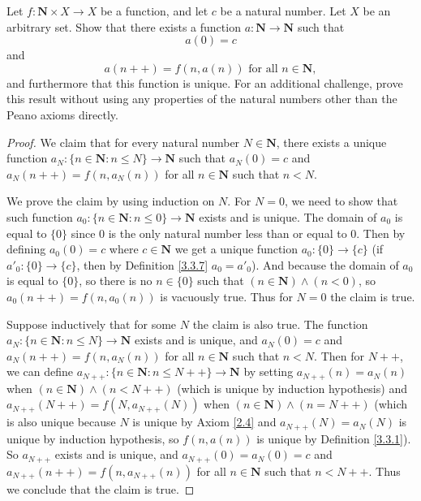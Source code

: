 \begin{exercise}\label{ex 3.5.12}
Let \(f : \mathbf{N} \times X \to X\) be a function, and let \(c\) be a natural number.
Let \(X\) be an arbitrary set.
Show that there exists a function \(a : \mathbf{N} \to \mathbf{N}\) such that
\[
    a(0) = c
\]
and
\[
    a(n++) = f(n, a(n)) \text{ for all } n \in \mathbf{N},
\]
and furthermore that this function is unique.
For an additional challenge, prove this result without using any properties of the natural numbers other than the Peano axioms directly.
\end{exercise}

\begin{proof}
We claim that for every natural number \(N \in \mathbf{N}\), there exists a unique function \(a_N : \{n \in \mathbf{N} : n \leq N\} \to \mathbf{N}\) such that \(a_N(0) = c\) and \(a_N(n++) = f(n, a_{N}(n))\) for all \(n \in \mathbf{N}\) such that \(n < N\).

We prove the claim by using induction on \(N\).
For \(N = 0\), we need to show that such function \(a_0 : \{n \in \mathbf{N} : n \leq 0\} \to \mathbf{N}\) exists and is unique.
The domain of \(a_0\) is equal to \(\{0\}\) since \(0\) is the only natural number less than or equal to \(0\).
Then by defining \(a_0(0) = c\) where \(c \in \mathbf{N}\) we get a unique function \(a_0 : \{0\} \to \{c\}\) (if \(a'_0 : \{0\} \to \{c\}\), then by Definition \ref{3.3.7} \(a_0 = a'_0\)).
And because the domain of \(a_0\) is equal to \(\{0\}\), so there is no \(n \in \{0\}\) such that \((n \in \mathbf{N}) \land (n < 0)\), so \(a_0(n++) = f(n, a_0(n))\) is vacuously true.
Thus for \(N = 0\) the claim is true.

Suppose inductively that for some \(N\) the claim is also true.
The function \(a_N : \{n \in \mathbf{N} : n \leq N\} \to \mathbf{N}\) exists and is unique, and \(a_N(0) = c\) and \(a_N(n++) = f(n, a_N(n))\) for all \(n \in \mathbf{N}\) such that \(n < N\).
Then for \(N++\), we can define \(a_{N++} : \{n \in \mathbf{N} : n \leq N++\} \to \mathbf{N}\) by setting \(a_{N++}(n) = a_N(n)\) when \((n \in \mathbf{N}) \land (n < N++)\) (which is unique by induction hypothesis) and \(a_{N++}(N++) = f(N, a_{N++}(N))\) when \((n \in \mathbf{N}) \land (n = N++)\) (which is also unique because \(N\) is unique by Axiom \ref{2.4} and \(a_{N++}(N) = a_N(N)\) is unique by induction hypothesis, so \(f(n, a(n))\) is unique by Definition \ref{3.3.1}).
So \(a_{N++}\) exists and is unique, and \(a_{N++}(0) = a_N(0) = c\) and \(a_{N++}(n++) = f(n, a_{N++}(n))\) for all \(n \in \mathbf{N}\) such that \(n < N++\).
Thus we conclude that the claim is true.


\end{proof}
